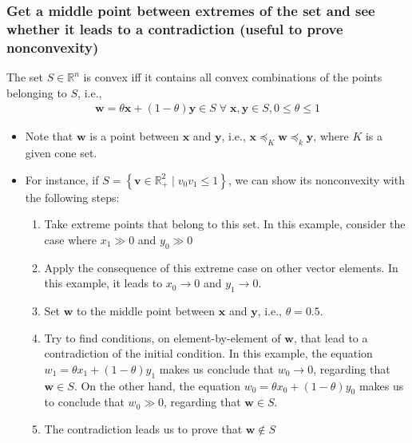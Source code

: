 \documentclass{article}
\begin{document}
\subsubsection{Get a middle point between extremes of the set and see whether it leads to a contradiction (useful to prove nonconvexity)}
The set \(S \in \mathbb{R}^{n}\) is convex iff it contains all convex combinations of the points belonging to \(S\), i.e.,
\begin{align}
	\mathbf{w} = \theta \mathbf{x} + (1-\theta)\mathbf{y} \in S \;\forall\; \mathbf{x}, \mathbf{y} \in S, 0\leq\theta\leq 1
\end{align}
\begin{itemize}
	\item Note that \(\mathbf{w}\) is a point between \(\mathbf{x}\) and \(\mathbf{y}\), i.e., \(\mathbf{x} \preceq_K \mathbf{w} \preceq_k \mathbf{y}\), where \(K\) is a given cone set.
	\item For instance, if \(S = \left\{ \mathbf{v} \in \mathbb{R}_{+}^{2} \mid v_0v_1 \leq 1 \right\}\), we can show its nonconvexity with the following steps:
	      \begin{enumerate}
		      \item Take extreme points that belong to this set. In this example, consider the case where \(x_1 \gg 0\) and \(y_0 \gg 0\)
		      \item Apply the consequence of this extreme case on other vector elements. In this example, it leads to \(x_0 \rightarrow 0\) and \(y_1 \rightarrow 0\).
		      \item Set \(\mathbf{w}\) to the middle point between \(\mathbf{x}\) and \(\mathbf{y}\), i.e., \(\theta = 0.5\).
		      \item Try to find conditions, on element-by-element of \(\mathbf{w}\), that lead to a contradiction of the initial condition. In this example, the equation \(w_1 = \theta x_1 + (1-\theta)y_1\) makes us conclude that \(w_0 \rightarrow 0\), regarding that \(\mathbf{w} \in S\). On the other hand, the equation \(w_0 = \theta x_0 + (1-\theta)y_0\) makes us to conclude that \(w_0 \gg 0\), regarding that \(\mathbf{w} \in S\).
		      \item The contradiction leads us to prove that \(\mathbf{w} \not\in S\)
	      \end{enumerate}
\end{itemize}
\end{document}
